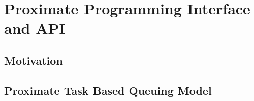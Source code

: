 \section{Proximate Programming Interface and API} \label{sec:prog}

\subsection{Motivation}



\subsection{Proximate Task Based Queuing Model}\label{sec:queue}

